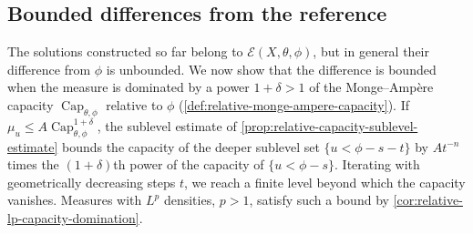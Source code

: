 \subsection{Bounded differences from the reference}
\label{sec:relative-capacity-boundedness}
The solutions constructed so far belong to $\mathcal E(X,\theta,\phi)$, but in general their difference from $\phi$ is unbounded. We now show that the difference is bounded when the measure is dominated by a power $1+\delta>1$ of the Monge--Amp\`ere capacity $\operatorname{Cap}_{\theta,\phi}$ relative to $\phi$ (\cref{def:relative-monge-ampere-capacity}). If $\mu_u\leq A\operatorname{Cap}_{\theta,\phi}^{1+\delta}$, the sublevel estimate of \cref{prop:relative-capacity-sublevel-estimate} bounds the capacity of the deeper sublevel set $\{u<\phi-s-t\}$ by $At^{-n}$ times the $(1+\delta)$th power of the capacity of $\{u<\phi-s\}$. Iterating with geometrically decreasing steps $t$, we reach a finite level beyond which the capacity vanishes. Measures with $L^p$ densities, $p>1$, satisfy such a bound by \cref{cor:relative-lp-capacity-domination}.

